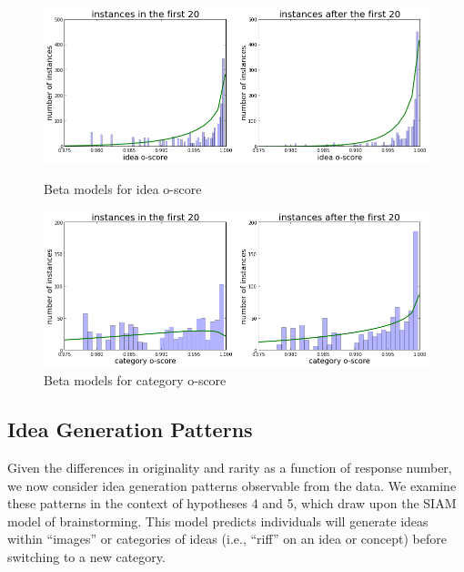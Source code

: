 
\begin{figure}[h]
    \centering
    \includegraphics[width=0.9\columnwidth]{hyp4_ideas}
    \caption{Beta models for idea o-score}
    \label{fig:idea_oscore_hyp4}
    \includegraphics[width=0.9\columnwidth]{hyp4_cats}
    \caption{Beta models for category o-score}
    \label{fig:cat_oscore_hyp4}
\end{figure}






\subsection{Idea Generation Patterns}
Given the differences in originality and rarity as a function of response number, we now consider idea generation patterns observable from the data. We examine these patterns in the context of hypotheses 4 and 5, which draw upon the SIAM model of brainstorming. This model predicts individuals will generate ideas within ``images'' or categories of ideas (i.e., ``riff'' on an idea or concept) before switching to a new category.

